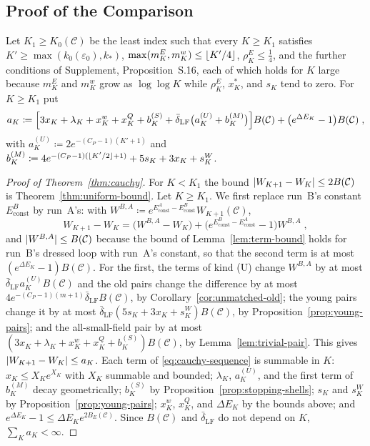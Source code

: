 \documentclass[11pt]{preprint}
\DeclarePairedDelimiter{\abs}{\lvert}{\rvert}
\DeclarePairedDelimiter{\floor}{\lfloor}{\rfloor}
\numberwithin{equation}{section}
\theoremstyle{definition}
\theoremstyle{remark}
\theoremstyle{plain}
\begin{document}
\subsection{Proof of the Comparison}\label{sec:cauchy-proof}

Let $K_1 \geq K_0(\mathcal C)$ be the least index such that every $K \geq K_1$ satisfies $K' \geq \max(k_0(\varepsilon_0), k_*)$, $\max(m^E_K, m^w_K) \leq \floor{K'/4}$, $\rho^E_K \leq \frac14$, and the further conditions of Supplement, Proposition~S.16, each of which holds for $K$ large because $m^E_K$ and $m^w_K$ grow as $\log\log K$ while $\rho^E_K$, $x^*_K$, and $s_K$ tend to zero. For $K \geq K_1$ put
\begin{equation}\label{eq:cauchy-sequence}
    a_K \coloneqq \Bigl[3x_K + \lambda_K + x^w_K + x^Q_K + b^{(S)}_K + \bar\delta_{\mathrm{LF}}\bigl(a^{(U)}_K + b^{(M)}_K\bigr)\Bigr]B(\mathcal C) + \bigl(e^{\Delta E_K} - 1\bigr)B(\mathcal C)\;,
\end{equation}
with $a^{(U)}_K \coloneqq 2e^{-(C_P-1)(K'+1)}$ and $b^{(M)}_K \coloneqq 4e^{-(C_P-1)(\floor{K'/2}+1)} + 5s_K + 3x_K + s^W_K$.

\begin{proof}[Proof of Theorem~\ref{thm:cauchy}]
For $K < K_1$ the bound $\abs{W_{K+1} - W_K} \leq 2B(\mathcal C)$ is Theorem~\ref{thm:uniform-bound}. Let $K \geq K_1$. We first replace run~B's constant $E^B_{\mathrm{const}}$ by run~A's: with $W^{B,A} \coloneqq e^{E^A_{\mathrm{const}} - E^B_{\mathrm{const}}}W_{K+1}(\mathcal C)$,
\begin{equation}\label{eq:constant-swap}
    W_{K+1} - W_K = \bigl(W^{B,A} - W_K\bigr) + \bigl(e^{E^B_{\mathrm{const}} - E^A_{\mathrm{const}}} - 1\bigr)W^{B,A}\;,
\end{equation}
and $\abs{W^{B,A}} \leq B(\mathcal C)$ because the bound of Lemma~\ref{lem:term-bound} holds for run~B's dressed loop with run~A's constant, so that the second term is at most $(e^{\Delta E_K} - 1)B(\mathcal C)$. For the first, the terms of kind (U) change $W^{B,A}$ by at most $\bar\delta_{\mathrm{LF}}a^{(U)}_KB(\mathcal C)$ and the old pairs change the difference by at most $4e^{-(C_P-1)(m+1)}\bar\delta_{\mathrm{LF}}B(\mathcal C)$, by Corollary~\ref{cor:unmatched-old}; the young pairs change it by at most $\bar\delta_{\mathrm{LF}}(5s_K + 3x_K + s^W_K)B(\mathcal C)$, by Proposition~\ref{prop:young-pairs}; and the all-small-field pair by at most $(3x_K + \lambda_K + x^w_K + x^Q_K + b^{(S)}_K)B(\mathcal C)$, by Lemma~\ref{lem:trivial-pair}. This gives $\abs{W_{K+1} - W_K} \leq a_K$. Each term of \eqref{eq:cauchy-sequence} is summable in $K$: $x_K \leq X_Ke^{X_K}$ with $X_K$ summable and bounded; $\lambda_K$, $a^{(U)}_K$, and the first term of $b^{(M)}_K$ decay geometrically; $b^{(S)}_K$ by Proposition~\ref{prop:stopping-shells}; $s_K$ and $s^W_K$ by Proposition~\ref{prop:young-pairs}; $x^w_K$, $x^Q_K$, and $\Delta E_K$ by the bounds above; and $e^{\Delta E_K} - 1 \leq \Delta E_Ke^{2B_E(\mathcal C)}$. Since $B(\mathcal C)$ and $\bar\delta_{\mathrm{LF}}$ do not depend on $K$, $\sum_Ka_K < \infty$.
\end{proof}
\end{document}
